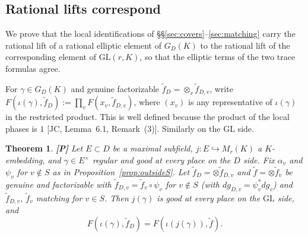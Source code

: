 \documentclass[12pt]{article}
\newcommand{\GL}{\mathrm{GL}}
\newcommand{\Pv}{\textbf{[P]}}
\theoremstyle{plain}
\newtheorem{theorem}{Theorem}[section]
\theoremstyle{definition}
\begin{document}
\subsection{Rational lifts correspond}\label{subsec:rational}
We prove that the local identifications of \S\S\ref{sec:covers}--\ref{sec:matching} carry the rational lift of a rational elliptic element of $G_D(K)$ to the rational lift of the corresponding element of $\GL(r,K)$, so that the elliptic terms of the two trace formulas agree.

For $\gamma\in G_D(K)$ and genuine factorizable $\tilde f_D=\otimes_v\tilde f_{D,v}$, write $F(\iota(\gamma),\tilde f_D):=\prod_vF(x_v,\tilde f_{D,v})$, where $(x_v)$ is any representative of $\iota(\gamma)$ in the restricted product. This is well defined because the product of the local phases is $1$ [JC, Lemma~6.1, Remark~(3)]. Similarly on the $\GL$ side.

\begin{theorem}\label{thm:rational}\Pv
Let $E\subset D$ be a maximal subfield, $j:E\hookrightarrow M_r(K)$ a $K$-embedding, and $\gamma\in E^\times$ regular and good at every place on the $D$ side. Fix $\alpha_v$ and $\psi_v$ for $v\notin S$ as in Proposition~\ref{prop:outsideS}. Let $\tilde f_D=\otimes\tilde f_{D,v}$ and $\tilde f=\otimes\tilde f_v$ be genuine and factorizable with $\tilde f_{D,v}=\tilde f_v\circ\psi_v$ for $v\notin S$ (with $dg_{D,v}=\psi_v^*dg_v$) and $\tilde f_{D,v}$, $\tilde f_v$ matching for $v\in S$. Then $j(\gamma)$ is good at every place on the $\GL$ side, and
\[ F(\iota(\gamma),\tilde f_D)=F(\iota(j(\gamma)),\tilde f). \]
\end{theorem}
\end{document}
